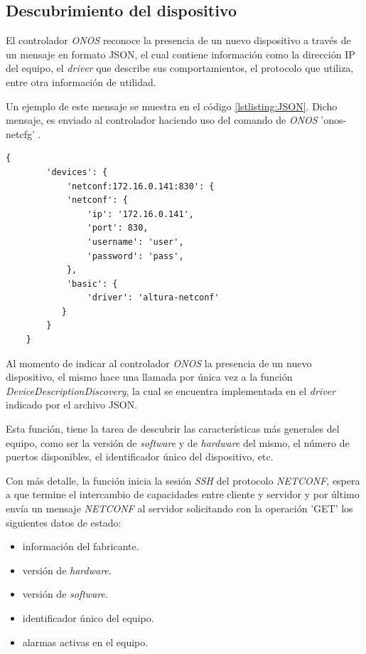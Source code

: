  \subsection{Descubrimiento del dispositivo} \label{driverr}
  El controlador \textit{ONOS} reconoce la presencia de un nuevo dispositivo a través de un mensaje en formato JSON, el cual contiene información como la dirección IP del equipo, el \textit{driver} que describe sus comportamientos, el protocolo que utiliza, entre otra información de utilidad. 
  
  Un ejemplo de este mensaje se muestra en el código \ref{lstlisting:JSON}. Dicho mensaje, es enviado al controlador haciendo uso del comando de \textit{ONOS} 'onos-netcfg' \parencite{onosconfserv}.

  \begin{lstlisting}[language=SHELXL, caption=Mensaje JSON con información del dispositivo., label=lstlisting:JSON]
    {
        'devices': {
            'netconf:172.16.0.141:830': {
            'netconf': {
                'ip': '172.16.0.141',
                'port': 830,
                'username': 'user',
                'password': 'pass',
            },
            'basic': {
                'driver': 'altura-netconf'
           }
        }
    }
    \end{lstlisting}


    Al momento de indicar al controlador \textit{ONOS} la presencia de un nuevo dispositivo, el mismo hace una llamada por única vez a la función \textit{DeviceDescriptionDiscovery}, la cual se encuentra implementada en el \textit{driver} indicado por el archivo JSON. 

    Esta función, tiene la tarea de descubrir las características más generales del equipo, como ser la versión de \textit{software} y de \textit{hardware} del mismo, el número de puertos disponibles, el identificador único del dispositivo, etc.

    Con más detalle, la función inicia la sesión \textit{SSH} del protocolo \textit{NETCONF}, espera a que termine el intercambio de capacidades entre cliente y servidor y por último envía un mensaje \textit{NETCONF} al servidor solicitando con la operación 'GET' los siguientes datos de estado:  
    
    \begin{itemize}
        \item información del fabricante.
        \item versión de \textit{hardware}.
        \item versión de \textit{software}.
        \item identificador único del equipo.
        \item alarmas activas en el equipo.
    \end{itemize}


